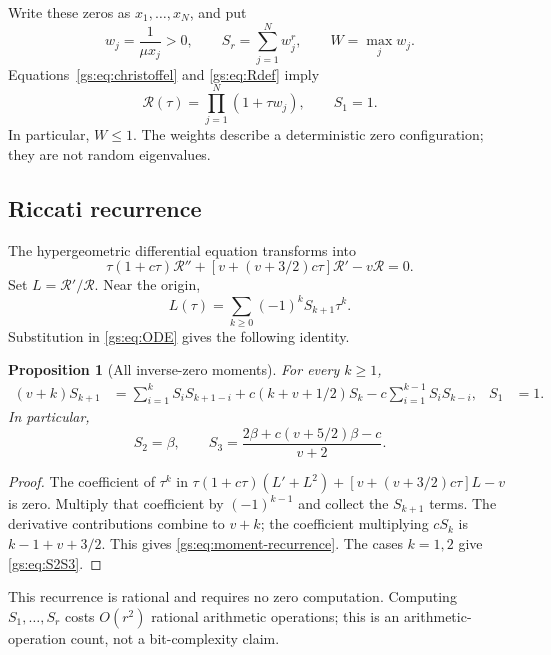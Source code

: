\documentclass[11pt,a4paper]{article}
\numberwithin{equation}{section}
\newtheorem{proposition}[theorem]{Proposition}
\theoremstyle{definition}
\theoremstyle{remark}
\newcommand{\Rgs}{\mathcal R}
\begin{document}
Write these zeros as $x_1,\ldots,x_N$, and put
\begin{equation}\label{gs:eq:weights}
 w_j=\frac1{\mu x_j}>0,\qquad
 S_r=\sum_{j=1}^N w_j^r,\qquad W=\max_j w_j.
\end{equation}
Equations~\eqref{gs:eq:christoffel} and \eqref{gs:eq:Rdef} imply
\begin{equation}\label{gs:eq:product}
 \Rgs(\tau)=\prod_{j=1}^N(1+\tau w_j),\qquad S_1=1.
\end{equation}
In particular, $W\le1$. The weights describe a deterministic zero
configuration; they are not random eigenvalues.

\subsection{Riccati recurrence}
The hypergeometric differential equation transforms into
\begin{equation}\label{gs:eq:ODE}
 \tau(1+c\tau)\Rgs''+
 [v+(v+3/2)c\tau]\Rgs'-v\Rgs=0.
\end{equation}
Set $L=\Rgs'/\Rgs$. Near the origin,
\begin{equation}\label{gs:eq:logderivative}
 L(\tau)=\sum_{k\ge0}(-1)^kS_{k+1}\tau^k.
\end{equation}
Substitution in \eqref{gs:eq:ODE} gives the following identity.

\begin{proposition}[All inverse-zero moments]\label{gs:prop:moment-recurrence}
For every $k\ge1$,
\begin{align}\label{gs:eq:moment-recurrence}
 (v+k)S_{k+1}
 &=\sum_{i=1}^kS_iS_{k+1-i}
   +c(k+v+1/2)S_k
   -c\sum_{i=1}^{k-1}S_iS_{k-i},
 &S_1&=1.
\end{align}
In particular,
\begin{equation}\label{gs:eq:S2S3}
 S_2=\beta,\qquad
 S_3=\frac{2\beta+c(v+5/2)\beta-c}{v+2}.
\end{equation}
\end{proposition}
\begin{proof}
The coefficient of $\tau^k$ in
$\tau(1+c\tau)(L'+L^2)+[v+(v+3/2)c\tau]L-v$
is zero. Multiply that coefficient by $(-1)^{k-1}$ and collect the
$S_{k+1}$ terms. The derivative contributions combine to $v+k$;
the coefficient multiplying $cS_k$ is $k-1+v+3/2$.
This gives \eqref{gs:eq:moment-recurrence}. The cases $k=1,2$ give
\eqref{gs:eq:S2S3}.
\end{proof}

This recurrence is rational and requires no zero computation. Computing
$S_1,\ldots,S_r$ costs $O(r^2)$ rational arithmetic operations; this is
an arithmetic-operation count, not a bit-complexity claim.
\end{document}
